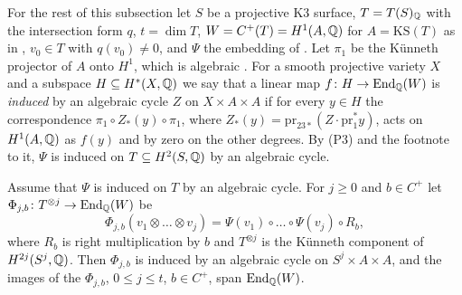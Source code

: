 For the rest of this subsection let $S$ be a projective K3 surface,
$T=T(S)_{\mathbb{Q}}$ with the intersection form $q$, $t=\dim T$,
$W=C^{+}(T)=H^{1}(A,\mathbb{Q})$ for $A=\mathrm{KS}(T)$ as in ,
$v_{0}\in T$ with $q(v_{0})\ne0$, and $\Psi$ the embedding of
. Let $\pi_{1}$ be the K\"unneth projector of $A$ onto
$H^{1}$, which is algebraic \cite[\S2]{Kle68}. For a smooth projective variety
$X$ and a subspace $H\subseteq H^{*}(X,\mathbb{Q})$ we say that a linear map
$f\colon H\to\operatorname{End}_{\mathbb{Q}}(W)$ is \emph{induced} by an algebraic cycle $Z$ on
$X\times A\times A$ if for every $y\in H$ the correspondence
$\pi_{1}\circ Z_{*}(y)\circ\pi_{1}$, where
$Z_{*}(y)=\mathrm{pr}_{23*}(Z\cdot\mathrm{pr}_{1}^{*}y)$, acts on $H^{1}(A,\mathbb{Q})$
as $f(y)$ and by zero on the other degrees. By (P3) and the footnote to it,
$\Psi$ is induced on $T\subseteq H^{2}(S,\mathbb{Q})$ by an algebraic cycle.

\begin{lemma}\label{lem:ksgenerates}
Assume that $\Psi$ is induced on $T$ by an algebraic cycle. For $j\ge0$ and
$b\in C^{+}$ let $\Phi_{j,b}\colon T^{\otimes j}\to\operatorname{End}_{\mathbb{Q}}(W)$ be
\[
  \Phi_{j,b}(v_{1}\otimes\dots\otimes v_{j})
  =\Psi(v_{1})\circ\dots\circ\Psi(v_{j})\circ R_{b},
\]
where $R_{b}$ is right multiplication by $b$ and $T^{\otimes j}$ is the
K\"unneth component of $H^{2j}(S^{j},\mathbb{Q})$. Then $\Phi_{j,b}$ is induced by an
algebraic cycle on $S^{j}\times A\times A$, and the images of the
$\Phi_{j,b}$, $0\le j\le t$, $b\in C^{+}$, span $\operatorname{End}_{\mathbb{Q}}(W)$.
\end{lemma}


